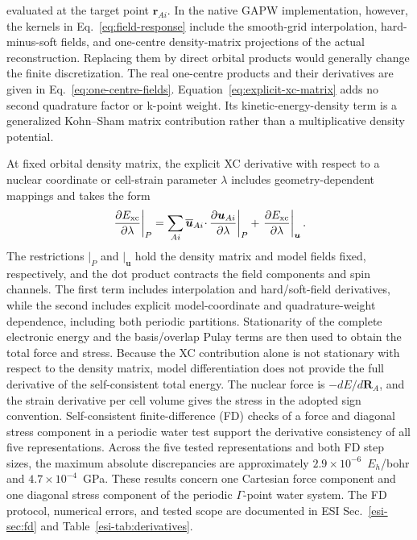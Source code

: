 \documentclass[10pt,a4paper,twocolumn]{article}
\newcommand{\uvec}{\boldsymbol{u}}
\begin{document}
evaluated at the target point $\mathbf r_{Ai}$. In the native GAPW implementation, however, the kernels in Eq.~\eqref{eq:field-response} include the smooth-grid interpolation, hard-minus-soft fields, and one-centre density-matrix projections of the actual reconstruction. Replacing them by direct orbital products would generally change the finite discretization. The real one-centre products and their derivatives are given in Eq.~\eqref{eq:one-centre-fields}. Equation~\eqref{eq:explicit-xc-matrix} adds no second quadrature factor or k-point weight. Its kinetic-energy-density term is a generalized Kohn--Sham matrix contribution rather than a multiplicative density potential.

At fixed orbital density matrix, the explicit XC derivative with respect to a nuclear coordinate or cell-strain parameter $\lambda$ includes geometry-dependent mappings and takes the form
\begin{equation}
 \left.\frac{\partial E_{\rm xc}}{\partial\lambda}\right|_P=
 \sum_{Ai}\overline{\uvec}_{Ai}\!\cdot\!
                 \left.\frac{\partial\uvec_{Ai}}{\partial\lambda}\right|_P
 +\left.\frac{\partial E_{\rm xc}}{\partial\lambda}\right|_{\uvec}.
 \label{eq:geometric-derivative}
\end{equation}
The restrictions $|_P$ and $|_{\uvec}$ hold the density matrix and model fields fixed, respectively, and the dot product contracts the field components and spin channels. The first term includes interpolation and hard/soft-field derivatives, while the second includes explicit model-coordinate and quadrature-weight dependence, including both periodic partitions. Stationarity of the complete electronic energy and the basis/overlap Pulay terms are then used to obtain the total force and stress. Because the XC contribution alone is not stationary with respect to the density matrix, model differentiation does not provide the full derivative of the self-consistent total energy. The nuclear force is $-dE/d\mathbf R_A$, and the strain derivative per cell volume gives the stress in the adopted sign convention. Self-consistent finite-difference (FD) checks of a force and diagonal stress component in a periodic water test support the derivative consistency of all five representations. Across the five tested representations and both FD step sizes, the maximum absolute discrepancies are approximately $2.9\times10^{-6}$~$E_h$/bohr and $4.7\times10^{-4}$~GPa. These results concern one Cartesian force component and one diagonal stress component of the periodic $\Gamma$-point water system. The FD protocol, numerical errors, and tested scope are documented in ESI Sec.~\ref{esi-sec:fd} and Table~\ref{esi-tab:derivatives}.
\end{document}
